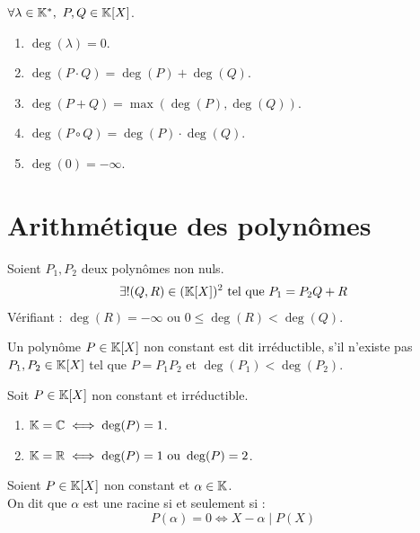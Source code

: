 \begin{proposition}
	$\forall \lambda \in \mathbb{K}^*,\ P, Q \in \mathbb{K}[X]$. 
	\begin{enumerate}
    		\item $\deg(\lambda) = 0$.
    		\item $\deg(P \cdot Q) = \deg(P) + \deg(Q)$.
    		\item $\deg(P + Q) = \max\left(\deg(P), \deg(Q)\right)$.
    		\item $\deg(P \circ Q) = \deg(P) \cdot \deg(Q)$.
            \item $\deg(0) = -\infty$.
    	\end{enumerate}
\end{proposition}

\section{Arithmétique des polynômes}

\begin{theorem}
	Soient $P_1, P_2$ deux polynômes non nuls.
	\begin{align*}
		\exists ! (Q, R) \in (\mathbb{K}[X])^2 \text{ tel que } P_1 = P_2 Q + R 
	\end{align*}
	Vérifiant :
	$\deg(R) = -\infty$ ou $0 \leq \deg(R) < \deg(Q)$.
\end{theorem}

\begin{definition}
	Un polynôme $P \in \mathbb{K}[X]$ non constant est dit irréductible, s'il n'existe pas $P_1, P_2 \in \mathbb{K}[X]$ tel que $P = P_1 P_2$ et $\deg(P_1) < \deg(P_2)$.
\end{definition}

\begin{proposition}
	Soit $P \in \mathbb{K}[X]$ non constant et irréductible.
	\begin{enumerate}
		\item $\mathbb{K} = \mathbb{C} \iff \deg(P) = 1$.
		\item $\mathbb{K} = \mathbb{R} \iff \deg(P) = 1 \text{ ou } \deg(P) = 2$. 
	\end{enumerate}
\end{proposition}

\begin{proposition}
	Soient $P \in \mathbb{K}[X]$ non constant et $\alpha \in \mathbb{K}$.
	\\
	On dit que $\alpha$ est une racine si et seulement si :
	\[ P(\alpha) = 0 \iff X - \alpha \mid P(X) \]
\end{proposition}

